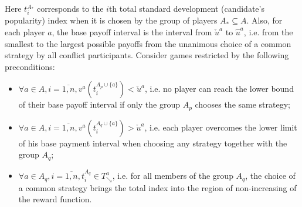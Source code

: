Here $t_i^{A_*}$ corresponds to the $i$th total standard development (candidate's popularity) index when it is chosen by the group of players $A_* \subseteq A$. Also, for each player $a$, the base payoff interval is the interval from $\check{u}^a$ to $\hat{u}^a$, i.e. from the smallest to the largest possible payoffs from the unanimous choice of a common strategy by all conflict participants. Consider games restricted by the following preconditions: %
\begin{itemize}
	\item $\forall a \in A, i = \overline{1,n}, v^a(t_i^{A_p \cup \{a\}}) < \check{u}^a$, i.e. no player can reach the lower bound of their base payoff interval if only the group $A_p$ chooses the same strategy; %
	\item $\forall a \in A, i = \overline{1,n}, v^a(t_i^{A_q \cup \{a\}}) > \check{u}^a$, i.e. each player overcomes the lower limit of his base payment interval when choosing any strategy together with the group $A_q$; %
	\item $\forall a \in A_q, i = \overline{1,n}, t_i^{A_q} \in T^a_{\searrow}$, i.e. for all members of the group $A_q$, the choice of a common strategy brings the total index into the region of non-increasing of the reward function. %
\end{itemize}

